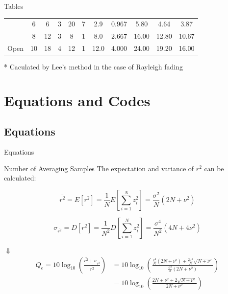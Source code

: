 \begin{frame}{Tables}
\begin{table}[!t]
\begin{threeparttable}[b]
\begin{tabular}{c|c||c|c||c|c||c|c||c|c|c}
           &  6 &    6 & 3 & 20 &  7 &  2.9 & 0.967 &  5.80 &  4.64 &  3.87\\
           &  8 &   12 & 3 &  8 &  1 &  8.0 & 2.667 & 16.00 & 12.80 & 10.67\\
Open       & 10 &   18 & 4 & 12 &  1 & 12.0 & 4.000 & 24.00 & 19.20 & 16.00\\
\hline
\end{tabular}
\begin{tablenotes}
\item[*] \tiny Caculated by Lee's method in the case of Rayleigh fading
\end{tablenotes}
\end{threeparttable}
\end{table}
\end{frame}

\section{Equations and Codes}
\subsection{Equations}
\begin{frame}{Equations}
\begin{block}{Number of Averaging Samples}
The expectation and variance of $r^2$ can be calculated:

\begin{equation}
    \bar{r^2}=E\left[r^2\right]=\frac{1}{N}E\left[\sum_{i=1}^{N}z_i^2\right]=\frac{\sigma^2}{N}\left(2N+\nu^2\right)
\label{number_mean}
\end{equation}

\begin{equation}
    \sigma_{\bar{r^2}}=D\left[r^2\right]=\frac{1}{N^2}D\left[\sum_{i=1}^{N}z_i^2\right]=\frac{\sigma^4}{N^2}\left(4N+4\nu^2\right)
\label{number_sigma}
\end{equation}
\end{block}
\pause
{}
{
\centering
{\Large $\Downarrow$}
\footnotesize
\begin{equation}
\begin{split}
    Q_e=10 \log_{10}\left(\frac{\bar{r^2}+\sigma_{\bar{r^2}}}{\bar{r^2}}\right)&=10 \log_{10}\left(\frac{\frac{\sigma^2}{N}\left(2N+\nu^2\right)+\frac{2\sigma^2}{N}\sqrt{N+\nu^2}}{\frac{\sigma^2}{N}(2N+\nu^2)}\right)\\
    &=10 \log_{10}\left(\frac{2N+\nu^2+2\sqrt{N+\nu^2}}{2N+\nu^2}\right)
\end{split}
\label{Q_e}
\end{equation}
}
\end{frame}


